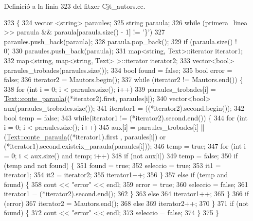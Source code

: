 Definició a la línia 323 del fitxer Cjt\+\_\+autors.\+cc.


\begin{DoxyCode}
323                                   \{
324     vector <string> paraules;
325     \textcolor{keywordtype}{string} paraula;
326     \textcolor{keywordflow}{while} (\hyperlink{class_cjt__autors_a833753dc5eaa466591f7dce971e5021c}{primera\_linea} >> paraula && paraula[paraula.size() - 1] != \textcolor{charliteral}{'\}'})
327         paraules.push\_back(paraula);
328     paraula.pop\_back();
329     \textcolor{keywordflow}{if} (paraula.size() != 0)
330         paraules.push\_back(paraula);
331     map<string, Text>::iterator iterator1;
332     map<string, map<string, Text> >::iterator iterator2;
333     vector<bool> paraules\_trobades(paraules.size());
334     \textcolor{keywordtype}{bool} found = \textcolor{keyword}{false};
335     \textcolor{keywordtype}{bool} error = \textcolor{keyword}{false};
336     iterator2 = Mautors.begin();
337     \textcolor{keywordflow}{while} (iterator2 != Mautors.end()) \{
338         \textcolor{keywordflow}{for} (\textcolor{keywordtype}{int} i = 0; i < paraules.size(); i++)
339             paraules\_trobades[i] = \hyperlink{class_text_a86b69aad96995bea56567e3450dbe25c}{Text::conte\_paraula}((*iterator2).first, paraules[i]);
340         vector<bool> aux(paraules\_trobades.size());
341         iterator1 = ((*iterator2).second.begin());
342         \textcolor{keywordtype}{bool} temp = \textcolor{keyword}{false};
343         \textcolor{keywordflow}{while}(iterator1 != (*iterator2).second.end()) \{
344             \textcolor{keywordflow}{for} (\textcolor{keywordtype}{int} i = 0; i < paraules.size(); i++)
345                 aux[i] = paraules\_trobades[i] || (\hyperlink{class_text_a86b69aad96995bea56567e3450dbe25c}{Text::conte\_paraula}((*iterator1).first
      , paraules[i]) or (*iterator1).second.existeix\_paraula(paraules[i]));
346             temp = \textcolor{keyword}{true};
347             \textcolor{keywordflow}{for} (\textcolor{keywordtype}{int} i = 0; i < aux.size() and temp; i++)
348                 \textcolor{keywordflow}{if} (not aux[i])
349                     temp = \textcolor{keyword}{false};
350             \textcolor{keywordflow}{if} (temp and not found) \{
351                 found = \textcolor{keyword}{true};
352                 seleccio = \textcolor{keyword}{true};
353                 it1 = iterator1;
354                 it2 = iterator2;
355                 iterator1++;
356             \}
357             \textcolor{keywordflow}{else} \textcolor{keywordflow}{if} (temp and found) \{
358                 cout << \textcolor{stringliteral}{"error"} << endl;
359                 error = \textcolor{keyword}{true};
360                 seleccio = \textcolor{keyword}{false};
361                 iterator1 = (*iterator2).second.end();
362             \}
363             \textcolor{keywordflow}{else}
364                 iterator1++;
365         \}
366         \textcolor{keywordflow}{if} (error)
367             iterator2 = Mautors.end();
368         \textcolor{keywordflow}{else}
369             iterator2++;
370     \}
371     \textcolor{keywordflow}{if} (not found) \{
372         cout << \textcolor{stringliteral}{"error"} << endl;
373         seleccio = \textcolor{keyword}{false};
374     \}
375 \}
\end{DoxyCode}
